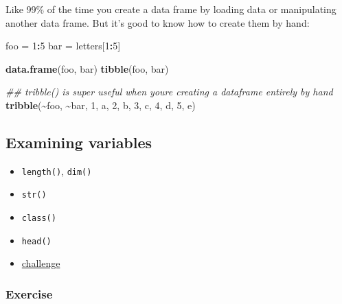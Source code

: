 \documentclass[
]{article}
\newenvironment{Shaded}{\begin{snugshade}}{\end{snugshade}}
\newcommand{\CommentTok}[1]{\textcolor[rgb]{0.56,0.35,0.01}{\textit{#1}}}
\newcommand{\DecValTok}[1]{\textcolor[rgb]{0.00,0.00,0.81}{#1}}
\newcommand{\KeywordTok}[1]{\textcolor[rgb]{0.13,0.29,0.53}{\textbf{#1}}}
\newcommand{\NormalTok}[1]{#1}
\newcommand{\OperatorTok}[1]{\textcolor[rgb]{0.81,0.36,0.00}{\textbf{#1}}}
\newcommand{\StringTok}[1]{\textcolor[rgb]{0.31,0.60,0.02}{#1}}
\providecommand{\tightlist}{%
  \setlength{\itemsep}{0pt}\setlength{\parskip}{0pt}}
\begin{document}
Like 99\% of the time you create a data frame by loading data or manipulating another data frame. But it's good to know how to create them by hand:

\begin{Shaded}
\begin{Highlighting}[]
\NormalTok{foo =}\StringTok{ }\DecValTok{1}\OperatorTok{:}\DecValTok{5}
\NormalTok{bar =}\StringTok{ }\NormalTok{letters[}\DecValTok{1}\OperatorTok{:}\DecValTok{5}\NormalTok{]}

\KeywordTok{data.frame}\NormalTok{(foo, bar)}
\KeywordTok{tibble}\NormalTok{(foo, bar)}

\CommentTok{\#\# tribble() is super useful when you\textquotesingle{}re creating a dataframe entirely by hand}
\KeywordTok{tribble}\NormalTok{(}\OperatorTok{\textasciitilde{}}\NormalTok{foo, }\OperatorTok{\textasciitilde{}}\NormalTok{bar, }
        \DecValTok{1}\NormalTok{, }\StringTok{\textquotesingle{}a\textquotesingle{}}\NormalTok{, }
        \DecValTok{2}\NormalTok{, }\StringTok{\textquotesingle{}b\textquotesingle{}}\NormalTok{, }
        \DecValTok{3}\NormalTok{, }\StringTok{\textquotesingle{}c\textquotesingle{}}\NormalTok{, }
        \DecValTok{4}\NormalTok{, }\StringTok{\textquotesingle{}d\textquotesingle{}}\NormalTok{, }
        \DecValTok{5}\NormalTok{, }\StringTok{\textquotesingle{}e\textquotesingle{}}\NormalTok{)}
\end{Highlighting}
\end{Shaded}

\hypertarget{examining-variables}{%
\subsection{Examining variables}\label{examining-variables}}

\begin{itemize}
\tightlist
\item
  \texttt{length()}, \texttt{dim()}
\item
  \texttt{str()}
\item
  \texttt{class()}
\item
  \texttt{head()}
\item
  \href{https://gge-ucd.github.io/R-DAVIS/lesson_how_r_thinks_about_data.html\#challenge}{challenge}
\end{itemize}

\hypertarget{exercise-2}{%
\subsubsection{Exercise}\label{exercise-2}}
\end{document}
